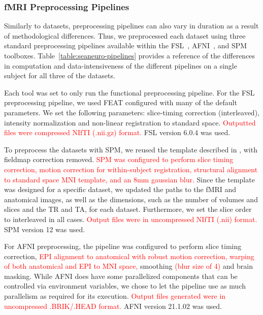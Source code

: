 \documentclass[pdflatex,sn-mathphys-num]{sn-jnl}
\newcommand{\vhs}[1]{\textcolor{red}{#1}}
\theoremstyle{thmstyleone}%
\theoremstyle{thmstyletwo}%
\theoremstyle{thmstylethree}%
\begin{document}
    
    
    \subsubsection{fMRI Preprocessing Pipelines}
    
    Similarly to datasets, preprocessing pipelines can also vary in duration as
    a result of methodological differences. Thus, we preprocessed each dataset
    using three standard preprocessing pipelines available within the FSL~\cite{fsl},
    AFNI~\cite{cox1996afni}, and SPM~\cite{spm} toolboxes.
    Table~\ref{table:seaneuro-pipelines} provides a reference of the differences
    in computation and data-intensiveness of the different pipelines on a single
    subject for all three of the datasets.
    
    Each tool was set to only run the functional preprocessing pipeline. For the FSL preprocessing pipeline, 
    we used FEAT configured with many of
    the default parameters. We set the following parameters: slice-timing
    correction (interleaved), intensity normalization and non-linear
    registration to standard space. \vhs{Outputted files were compressed NIfTI (.nii.gz) format.} FSL version 6.0.4 was used.
    
    To preprocess the datasets with SPM, we reused the template described in
    \cite{haitas2021age}, with fieldmap correction removed. \vhs{SPM was configured to perform slice timing correction, motion correction for within-subject registration, structural alignment to standard space MNI template, and an 8mm gaussian blur.} Since the template was
    designed for a specific dataset, we updated the paths to the fMRI and
    anatomical images, as well as the dimensions, such as the number of volumes
    and slices and the TR and TA, for each dataset. Furthermore, we set the
    slice order to interleaved in all cases. \vhs{Output files were in uncompressed NIfTI (.nii) format.} SPM version 12 was used.
    
    For AFNI preprocessing, the pipeline was configured to perform slice timing correction, \vhs{EPI alignment to anatomical with robust motion correction, 
    warping of both anatomical and EPI to MNI space,} smoothing \vhs{(blur size of 4)} and brain masking.
    While AFNI does have some parallelized components that can be controlled via
    environment variables, we chose to let the pipeline use as much parallelism
    as required for its execution. \vhs{Output files generated were in uncompressed .BRIK/.HEAD format.} AFNI version 21.1.02 was used.
\end{document}
